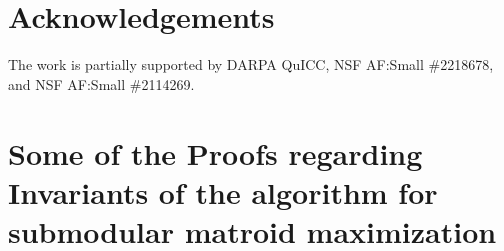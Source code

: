 \documentclass[11pt]{article}
\begin{document}
\newcommand{\LNCS}{Lecture Notes in Computer Science}
\newcommand{\RSA}{Random Structures and Algorithms}
\newcommand{\SPAA}{Annual ACM Symposium on Parallel Algorithms and Architectures (SPAA)}
\newcommand{\STACS}{Annual Symposium on Theoretical Aspects of Computer Science (STACS)}
\newcommand{\SWAT}{Scandinavian Workshop on Algorithm Theory (SWAT)}
\newcommand{\TALG}{ACM Transactions on Algorithms}
\newcommand{\UAI}{Conference on Uncertainty in Artificial Intelligence (UAI)}
\newcommand{\WADS}{Workshop on Algorithms and Data Structures (WADS)}
\newcommand{\SICOMP}{SIAM Journal on Computing}
\newcommand{\JCSS}{Journal of Computer and System Sciences}
\newcommand{\JASIS}{Journal of the American society for information science}
\newcommand{\PMS}{ Philosophical Magazine Series}
\newcommand{\ML}{Machine Learning}
\newcommand{\DCG}{Discrete and Computational Geometry}
\newcommand{\TODS}{ACM Transactions on Database Systems (TODS)}
\newcommand{\PHREV}{Physical Review E}
\newcommand{\NATS}{National Academy of Sciences}
\newcommand{\MPHy}{Reviews of Modern Physics}
\newcommand{\NRG}{Nature Reviews : Genetics}
\newcommand{\BullAMS}{Bulletin (New Series) of the American Mathematical Society}
\newcommand{\AMSM}{The American Mathematical Monthly}
\newcommand{\JAM}{SIAM Journal on Applied Mathematics}
\newcommand{\JDM}{SIAM Journal of  Discrete Math}
\newcommand{\JASM}{Journal of the American Statistical Association}
\newcommand{\JALG}{Journal of Algorithms}
\newcommand{\TIT}{IEEE Transactions on Information Theory}
\newcommand{\CM}{Contemporary Mathematics}
\newcommand{\JC}{Journal of Complexity}
\newcommand{\TSE}{IEEE Transactions on Software Engineering}
\newcommand{\TNDE}{IEEE Transactions on Knowledge and Data Engineering}
\newcommand{\JIC}{Journal Information and Computation}
\newcommand{\ToC}{Theory of Computing}
\newcommand{\MST}{Mathematical Systems Theory}
\newcommand{\Com}{Combinatorica}
\newcommand{\NC}{Neural Computation}
\newcommand{\TAP}{The Annals of Probability}
\newcommand{\TCS}{Theoretical Computer Science}
\newcommand{\IPL}{Information Processing Letter}
\newcommand{\Algorithmica}{Algorithmica}


\section{Acknowledgements}
The work is partially supported by DARPA QuICC, NSF AF:Small  \#2218678, and  NSF AF:Small  \#2114269. 



\appendix 
\section{Some of the Proofs regarding Invariants of the algorithm for submodular matroid maximization}
\label{sec:invar_appendix}
\end{document}
